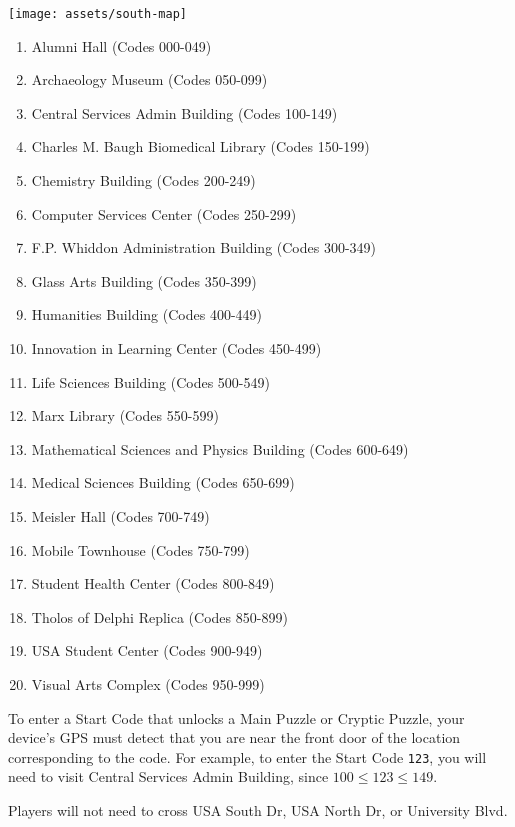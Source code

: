 \begin{center}
  \texttt{[image: assets/south-map]}
\end{center}

\begin{multicols}{2}
  \begin{enumerate}
    \item Alumni Hall (Codes 000-049) %
    \item Archaeology Museum (Codes 050-099)
    \item Central Services Admin Building (Codes 100-149) %
    \item Charles M. Baugh Biomedical Library (Codes 150-199) %
    \item Chemistry Building (Codes 200-249) %
    \item Computer Services Center (Codes 250-299)
    \item F.P. Whiddon Administration Building (Codes 300-349) %
    \item Glass Arts Building (Codes 350-399) %
    \item Humanities Building (Codes 400-449) %
    \item Innovation in Learning Center (Codes 450-499)
    \item Life Sciences Building (Codes 500-549)
    \item Marx Library (Codes 550-599) %
    \item Mathematical Sciences and Physics Building (Codes 600-649)
    \item Medical Sciences Building (Codes 650-699)
    \item Meisler Hall (Codes 700-749) %
    \item Mobile Townhouse (Codes 750-799)
    \item Student Health Center (Codes 800-849) %
    \item Tholos of Delphi Replica (Codes 850-899)
    \item USA Student Center (Codes 900-949)
    \item Visual Arts Complex (Codes 950-999) %
  \end{enumerate}
\end{multicols}

To enter a Start Code that unlocks a Main Puzzle or Cryptic Puzzle,
your device's GPS must detect that you are near the front door of 
the location corresponding to the code. 
For example, to enter the Start Code \texttt{123}, you
will need to visit Central Services Admin Building, since
\(100\leq 123\leq 149\).

Players will not need to cross USA South Dr, USA North Dr, or University Blvd.
